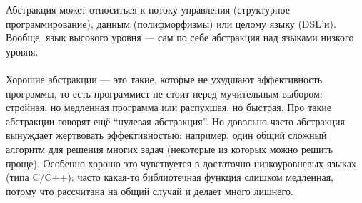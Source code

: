 \documentclass[11pt]{book}
\begin{document}
Абстракция может относиться к потоку управления (структурное программирование), данным (полифморфизмы)
или целому языку (DSL'и).
Вообще, язык высокого уровня --- сам по себе абстракция над языками низкого уровня.
\\ \\
Хорошие абстракции --- это такие, которые не ухудшают эффективность программы,
то есть программист не стоит перед мучительным выбором: стройная, но медленная программа или распухшая, но быстрая.
Про такие абстракции говорят ещё ``нулевая абстракция''.
Но довольно часто абстракция вынуждает жертвовать эффективностью:
например, один общий сложный алгоритм для решения многих задач (некоторые из которых можно решить проще).
Особенно хорошо это чувствуется в достаточно низкоуровневых языках (типа C/C++):
часто какая-то библиотечная функция слишком медленная, потому что рассчитана на общий случай и делает много лишнего.
\end{document}
